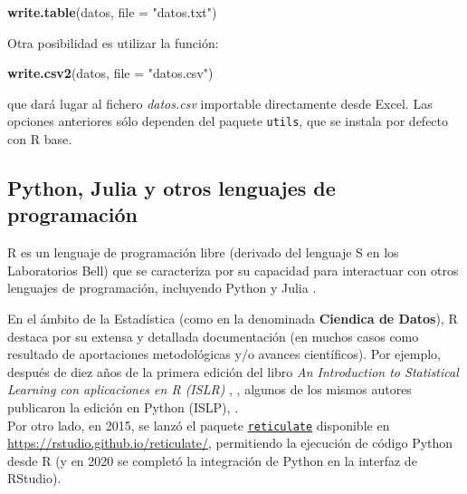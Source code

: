 \documentclass[
]{book}
\newenvironment{Shaded}{\begin{snugshade}}{\end{snugshade}}
\newcommand{\AttributeTok}[1]{\textcolor[rgb]{0.13,0.29,0.53}{#1}}
\newcommand{\FunctionTok}[1]{\textcolor[rgb]{0.13,0.29,0.53}{\textbf{#1}}}
\newcommand{\NormalTok}[1]{#1}
\newcommand{\OtherTok}[1]{\textcolor[rgb]{0.56,0.35,0.01}{#1}}
\newcommand{\SpecialCharTok}[1]{\textcolor[rgb]{0.81,0.36,0.00}{\textbf{#1}}}
\newcommand{\StringTok}[1]{\textcolor[rgb]{0.31,0.60,0.02}{#1}}
\begin{document}
\begin{Shaded}
\begin{Highlighting}[]
\FunctionTok{write.table}\NormalTok{(datos, }\AttributeTok{file =} \StringTok{"datos.txt"}\NormalTok{)}
\end{Highlighting}
\end{Shaded}

Otra posibilidad es utilizar la función:

\begin{Shaded}
\begin{Highlighting}[]
\FunctionTok{write.csv2}\NormalTok{(datos, }\AttributeTok{file =} \StringTok{"datos.csv"}\NormalTok{)}
\end{Highlighting}
\end{Shaded}

que dará lugar al fichero \emph{datos.csv} importable directamente desde Excel. Las opciones anteriores sólo dependen del paquete \texttt{utils}, que se instala por defecto con R base.

\hypertarget{python-julia-y-otros-lenguajes-de-programaciuxf3n}{%
\subsection{Python, Julia y otros lenguajes de programación}\label{python-julia-y-otros-lenguajes-de-programaciuxf3n}}

R es un lenguaje de programación libre (derivado del lenguaje S en los Laboratorios Bell) que se caracteriza por su capacidad para interactuar con otros lenguajes de programación, incluyendo Python \citep{python} y Julia \citep{julia}.

En el ámbito de la Estadística (como en la denominada \textbf{Ciendica de Datos}), R destaca por su extensa y detallada documentación (en muchos casos como resultado de aportaciones metodológicas y/o avances científicos). Por ejemplo, después de diez años de la primera edición del libro \emph{An Introduction to Statistical Learning con aplicaciones en R (ISLR)} , \citet{james2013introduction}, algunos de los mismos autores publicaron la edición en Python (ISLP), \citet{james2023introduction}.\\
Por otro lado, en 2015, se lanzó el paquete \href{https://rstudio.github.io/reticulate/}{\texttt{reticulate}} disponible en \url{https://rstudio.github.io/reticulate/}, permitiendo la ejecución de código Python desde R (y en 2020 se completó la integración de Python en la interfaz de RStudio).

\begin{Shaded}
\end{Shaded}
\end{document}

